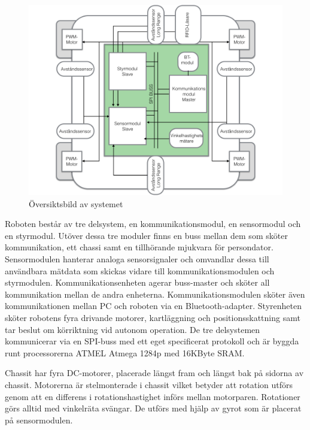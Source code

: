\documentclass[a4paper,12pt,fleqn]{article}
\begin{document}
\begin{figure}[htp] %
  \begin{center}
  \includegraphics[keepaspectratio=true,width=\linewidth]{bilder/overview}  %
  \end{center}
  \caption{Översiktsbild av systemet} %
  \label{fig:overview}
\end{figure}

Roboten består av tre delsystem, en kommunikationsmodul, en sensormodul och en styrmodul. Utöver dessa tre moduler finns en buss mellan dem som sköter kommunikation, ett chassi samt en tillhörande mjukvara för persondator. Sensormodulen hanterar analoga sensorsignaler och omvandlar dessa till användbara mätdata som skickas vidare till kommunikationsmodulen och styrmodulen. 
Kommunikationsenheten agerar buss-master och sköter all kommunikation mellan de andra enheterna. Kommunikationsmodulen sköter även kommunikationen mellan PC och roboten via en Bluetooth-adapter. Styrenheten sköter robotens fyra drivande motorer, kartläggning och positionsskattning samt tar beslut om körriktning vid autonom operation. 
De tre delsystemen kommunicerar via en SPI-buss med ett eget specificerat protokoll och är byggda runt processorerna ATMEL Atmega 1284p med 16KByte SRAM. 
\newpage

Chassit har fyra DC-motorer, placerade längst fram och längst bak på sidorna av chassit. Motorerna är stelmonterade i chassit vilket betyder att rotation utförs genom att en differens i rotationshastighet införs mellan motorparen. Rotationer görs alltid med vinkelräta svängar. De utförs med hjälp av gyrot som är placerat på sensormodulen. 
\end{document}
